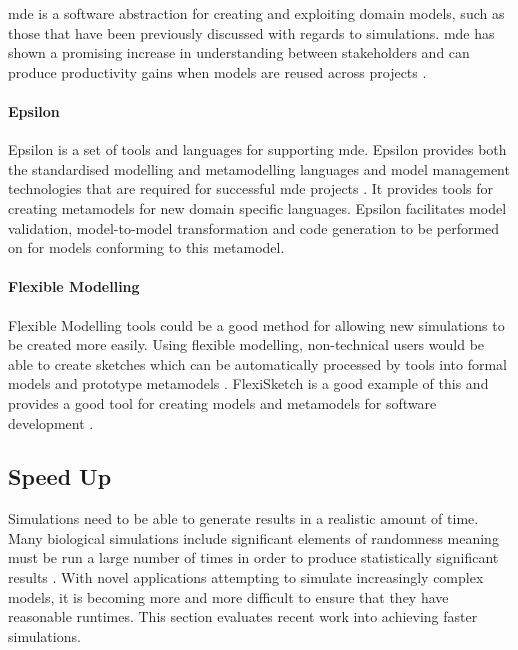 \documentclass{UoYCSproject}
\begin{document}
\gls{mde} is a software abstraction for creating and exploiting domain models, such as those that have been previously discussed with regards to simulations.
\gls{mde} has shown a promising increase in understanding between stakeholders and can produce productivity gains when models are reused across projects \cite{mde_industry_review}.

\paragraph{Epsilon} Epsilon is a set of tools and languages for supporting \gls{mde}.
Epsilon provides both the standardised modelling and metamodelling languages and model management technologies that are required for successful \gls{mde} projects \cite{eol}.
It provides tools for creating metamodels for new domain specific languages.
Epsilon facilitates model validation, model-to-model transformation and code generation to be performed on for models conforming to this metamodel. \cite{epsilon_book}


\paragraph{Flexible Modelling}
Flexible Modelling tools could be a good method for allowing new simulations to be created more easily.
Using flexible modelling, non-technical users would be able to create sketches which can be automatically processed by tools into formal models and prototype metamodels \cite{Paige2017}.
FlexiSketch is a good example of this and provides a good tool for creating models and metamodels for software development \cite{flexisketch}.

\subsection{Speed Up}
Simulations need to be able to generate results in a realistic amount of time.
Many biological simulations include significant elements of randomness meaning must be run a large number of times in order to produce statistically significant results \cite{spartan}.
With novel applications attempting to simulate increasingly complex models, it is becoming more and more difficult to ensure that they have reasonable runtimes.
This section evaluates recent work into achieving faster simulations.
\end{document}
